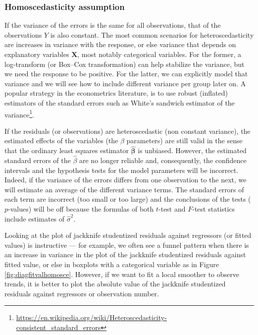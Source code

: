 \documentclass[
  11pt,
  letterpaper,
]{book}
\renewcommand{\href}[2]{#2\footnote{\url{#1}}}
\theoremstyle{definition}
\theoremstyle{definition}
\theoremstyle{definition}
\theoremstyle{remark}
\begin{document}
\hypertarget{homoscedasticity-assumption}{%
\subsubsection{Homoscedasticity assumption}\label{homoscedasticity-assumption}}

If the variance of the errors is the same for all observations, that of the observations \(Y\) is also constant. The most common scenarios for heteroscedasticity are increases in variance with the response, or else variance that depends on explanatory variables \(\mathbf{X}\), most notably categorical variables. For the former, a log-transform (or Box--Cox transformation) can help stabilize the variance, but we need the response to be positive. For the latter, we can explicitly model that variance and we will see how to include different variance per group later on. A popular strategy in the econometrics literature, is to use robust (inflated) estimators of the standard errors such as \href{https://en.wikipedia.org/wiki/Heteroscedasticity-consistent_standard_errors}{White's sandwich estimator of the variance}.

If the residuals (or observations) are heteroscedastic (non constant variance), the estimated effects of the variables (the \(\beta\) parameters) are still valid in the sense that the ordinary least squares estimator \(\widehat{\boldsymbol{\beta}}\) is unbiased. However, the estimated standard errors of the \(\widehat{\beta}\) are no longer reliable and, consequently, the confidence intervals and the hypothesis tests for the model parameters will be incorrect. Indeed, if the variance of the errors differs from one observation to the next, we will estimate an average of the different variance terms. The standard errors of each term are incorrect (too small or too large) and the conclusions of the tests (\(p\)-values) will be off because the formulas of both \(t\)-test and \(F\)-test statistics include estimates of \(\hat{\sigma}^2\).

Looking at the plot of jackknife studentized residuals against regressors (or fitted values) is instructive --- for example, we often see a funnel pattern when there is an increase in variance in the plot of the jackknife studentized residuals against fitted value, or else in boxplots with a categorical variable as in Figure \ref{fig:diagfitvalhomosce}.
However, if we want to fit a local smoother to observe trends, it is better to plot the absolute value of the jackknife studentized residuals against regressors or observation number.
\end{document}
